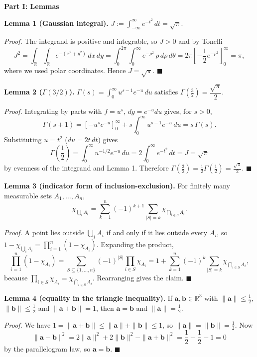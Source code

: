 \begin{enumerate}
 \textbf{Part I: Lemmas}

 \textbf{Lemma 1 (Gaussian integral).} $J:=\int_{-\infty}^{\infty}e^{-t^2}\,dt=\sqrt{\pi}$.

 \textit{Proof.} The integrand is positive and integrable, so $J>0$ and by Tonelli
 \[J^2=\int_{\mathbb{R}}\int_{\mathbb{R}}e^{-(x^2+y^2)}\,dx\,dy=\int_0^{2\pi}\int_0^{\infty}e^{-\rho^2}\,\rho\,d\rho\,d\theta=2\pi\left[-\frac12e^{-\rho^2}\right]_0^{\infty}=\pi,\]where we used polar coordinates. Hence $J=\sqrt{\pi}$. $\blacksquare$

 \textbf{Lemma 2 ($\Gamma(3/2)$).} $\Gamma(s)=\int_0^\infty u^{s-1}e^{-u}\,du$ satisfies $\Gamma\left(\frac32\right)=\dfrac{\sqrt{\pi}}{2}$.

 \textit{Proof.} Integrating by parts with $f=u^{s}$, $dg=e^{-u}du$ gives, for $s>0$,
 \[\Gamma(s+1)=\left[-u^{s}e^{-u}\right]_0^\infty+s\int_0^\infty u^{s-1}e^{-u}\,du=s\,\Gamma(s).\]Substituting $u=t^2$ ($du=2t\,dt$) gives
 \[\Gamma\left(\frac12\right)=\int_0^\infty u^{-1/2}e^{-u}\,du=2\int_0^\infty e^{-t^2}\,dt=J=\sqrt{\pi}\]by evenness of the integrand and Lemma 1. Therefore $\Gamma\left(\frac32\right)=\frac12\Gamma\left(\frac12\right)=\frac{\sqrt{\pi}}{2}$. $\blacksquare$

 \textbf{Lemma 3 (indicator form of inclusion-exclusion).} For finitely many measurable sets $A_1,\dots,A_n$,
 \[\chi_{\bigcup_{i}A_i}=\sum_{k=1}^{n}(-1)^{k+1}\sum_{|S|=k}\chi_{\bigcap_{i\in S}A_i}.\]

 \textit{Proof.} A point lies outside $\bigcup_i A_i$ if and only if it lies outside every $A_i$, so $1-\chi_{\bigcup_i A_i}=\prod_{i=1}^n(1-\chi_{A_i})$. Expanding the product,
 \[\prod_{i=1}^n(1-\chi_{A_i})=\sum_{S\subseteq\{1,\dots,n\}}(-1)^{|S|}\prod_{i\in S}\chi_{A_i}=1+\sum_{k=1}^{n}(-1)^{k}\sum_{|S|=k}\chi_{\bigcap_{i\in S}A_i},\]because $\prod_{i\in S}\chi_{A_i}=\chi_{\bigcap_{i\in S}A_i}$. Rearranging gives the claim. $\blacksquare$

 \textbf{Lemma 4 (equality in the triangle inequality).} If $\mathbf{a},\mathbf{b}\in\mathbb{R}^3$ with $\|\mathbf{a}\|\le\frac12$, $\|\mathbf{b}\|\le\frac12$ and $\|\mathbf{a}+\mathbf{b}\|=1$, then $\mathbf{a}=\mathbf{b}$ and $\|\mathbf{a}\|=\frac12$.

 \textit{Proof.} We have $1=\|\mathbf{a}+\mathbf{b}\|\le\|\mathbf{a}\|+\|\mathbf{b}\|\le1$, so $\|\mathbf{a}\|=\|\mathbf{b}\|=\frac12$. Now
 \[\|\mathbf{a}-\mathbf{b}\|^2=2\|\mathbf{a}\|^2+2\|\mathbf{b}\|^2-\|\mathbf{a}+\mathbf{b}\|^2=\frac12+\frac12-1=0\]by the parallelogram law, so $\mathbf{a}=\mathbf{b}$. $\blacksquare$


\end{enumerate}
